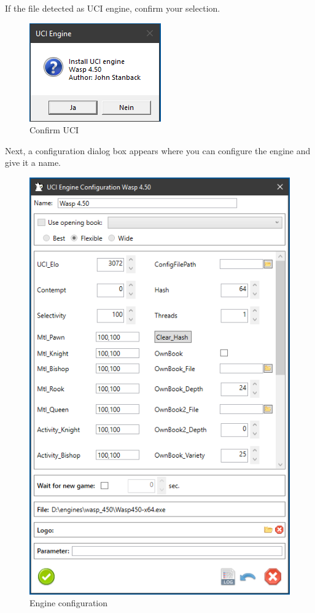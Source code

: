 \documentclass[11pt,a4paper]{article}
\begin{document}
If the file detected as UCI engine, confirm your selection.\\
\begin{figure}[H]
	\centering
	\includegraphics[scale=1.0]{uciConfirm.png}
	\caption{Confirm UCI}
	\label{fig:uciConfirm}
\end{figure}
Next, a configuration dialog box appears where you can configure the engine and give it a name.
\begin{figure}[H]
	\centering
	\includegraphics[scale=0.9]{ConfigureWasp.png}
	\caption{Engine configuration}
	\label{fig:ConfigurWasp}
\end{figure}
\end{document}
